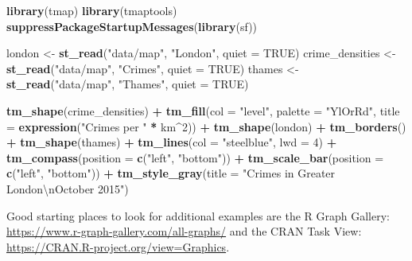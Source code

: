 \documentclass[]{book}
\newenvironment{Shaded}{\begin{snugshade}}{\end{snugshade}}
\newcommand{\KeywordTok}[1]{\textcolor[rgb]{0.13,0.29,0.53}{\textbf{#1}}}
\newcommand{\DataTypeTok}[1]{\textcolor[rgb]{0.13,0.29,0.53}{#1}}
\newcommand{\DecValTok}[1]{\textcolor[rgb]{0.00,0.00,0.81}{#1}}
\newcommand{\CharTok}[1]{\textcolor[rgb]{0.31,0.60,0.02}{#1}}
\newcommand{\StringTok}[1]{\textcolor[rgb]{0.31,0.60,0.02}{#1}}
\newcommand{\OtherTok}[1]{\textcolor[rgb]{0.56,0.35,0.01}{#1}}
\newcommand{\OperatorTok}[1]{\textcolor[rgb]{0.81,0.36,0.00}{\textbf{#1}}}
\newcommand{\NormalTok}[1]{#1}
\theoremstyle{definition}
\theoremstyle{definition}
\theoremstyle{definition}
\theoremstyle{remark}
\begin{document}
\begin{Shaded}
\begin{Highlighting}[]
\KeywordTok{library}\NormalTok{(tmap)}
\KeywordTok{library}\NormalTok{(tmaptools)}
\KeywordTok{suppressPackageStartupMessages}\NormalTok{(}\KeywordTok{library}\NormalTok{(sf))}
              
\NormalTok{london <-}\StringTok{ }\KeywordTok{st_read}\NormalTok{(}\StringTok{"data/map"}\NormalTok{, }\StringTok{"London"}\NormalTok{, }\DataTypeTok{quiet =} \OtherTok{TRUE}\NormalTok{)}
\NormalTok{crime_densities <-}\StringTok{ }\KeywordTok{st_read}\NormalTok{(}\StringTok{"data/map"}\NormalTok{, }\StringTok{"Crimes"}\NormalTok{, }\DataTypeTok{quiet =} \OtherTok{TRUE}\NormalTok{)}
\NormalTok{thames <-}\StringTok{ }\KeywordTok{st_read}\NormalTok{(}\StringTok{"data/map"}\NormalTok{, }\StringTok{"Thames"}\NormalTok{, }\DataTypeTok{quiet =} \OtherTok{TRUE}\NormalTok{)}

\KeywordTok{tm_shape}\NormalTok{(crime_densities) }\OperatorTok{+}
\StringTok{  }\KeywordTok{tm_fill}\NormalTok{(}\DataTypeTok{col =} \StringTok{"level"}\NormalTok{, }\DataTypeTok{palette =} \StringTok{"YlOrRd"}\NormalTok{, }
    \DataTypeTok{title =} \KeywordTok{expression}\NormalTok{(}\StringTok{"Crimes per "} \OperatorTok{*}\StringTok{ }\NormalTok{km}\OperatorTok{^}\DecValTok{2}\NormalTok{)) }\OperatorTok{+}\StringTok{ }
\KeywordTok{tm_shape}\NormalTok{(london) }\OperatorTok{+}\StringTok{ }\KeywordTok{tm_borders}\NormalTok{() }\OperatorTok{+}
\KeywordTok{tm_shape}\NormalTok{(thames) }\OperatorTok{+}\StringTok{ }\KeywordTok{tm_lines}\NormalTok{(}\DataTypeTok{col =} \StringTok{"steelblue"}\NormalTok{, }\DataTypeTok{lwd =} \DecValTok{4}\NormalTok{) }\OperatorTok{+}
\KeywordTok{tm_compass}\NormalTok{(}\DataTypeTok{position =} \KeywordTok{c}\NormalTok{(}\StringTok{"left"}\NormalTok{, }\StringTok{"bottom"}\NormalTok{)) }\OperatorTok{+}
\KeywordTok{tm_scale_bar}\NormalTok{(}\DataTypeTok{position =} \KeywordTok{c}\NormalTok{(}\StringTok{"left"}\NormalTok{, }\StringTok{"bottom"}\NormalTok{)) }\OperatorTok{+}\StringTok{ }
\KeywordTok{tm_style_gray}\NormalTok{(}\DataTypeTok{title =} \StringTok{"Crimes in Greater London}\CharTok{\textbackslash{}n}\StringTok{October 2015"}\NormalTok{)}
\end{Highlighting}
\end{Shaded}

Good starting places to look for additional examples are the R Graph
Gallery: \url{https://www.r-graph-gallery.com/all-graphs/} and the CRAN
Task View: \url{https://CRAN.R-project.org/view=Graphics}.
\end{document}

